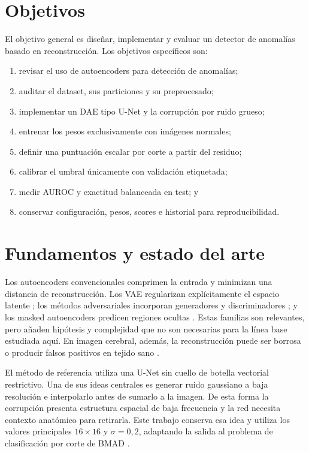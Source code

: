 \documentclass[10pt,a4paper,twocolumn]{article}
\begin{document}
\section{Objetivos}
El objetivo general es diseñar, implementar y evaluar un detector de anomalías
basado en reconstrucción. Los objetivos específicos son:
\begin{enumerate}
  \item revisar el uso de autoencoders para detección de anomalías;
  \item auditar el dataset, sus particiones y su preprocesado;
  \item implementar un DAE tipo U-Net y la corrupción por ruido grueso;
  \item entrenar los pesos exclusivamente con imágenes normales;
  \item definir una puntuación escalar por corte a partir del residuo;
  \item calibrar el umbral únicamente con validación etiquetada;
  \item medir AUROC y exactitud balanceada en test; y
  \item conservar configuración, pesos, scores e historial para reproducibilidad.
\end{enumerate}

\section{Fundamentos y estado del arte}
Los autoencoders convencionales comprimen la entrada y minimizan una distancia
de reconstrucción. Los VAE regularizan explícitamente el espacio latente
\cite{kingma2014vae}; los métodos adversariales incorporan generadores y
discriminadores \cite{goodfellow2014gan}; y los masked autoencoders predicen
regiones ocultas \cite{he2022mae,georgescu2023masked}. Estas familias son
relevantes, pero añaden hipótesis y complejidad que no son necesarias para la
línea base estudiada aquí. En imagen cerebral, además, la reconstrucción puede
ser borrosa o producir falsos positivos en tejido sano
\cite{baur2021autoencoders}.

El método de referencia \cite{kascenas2022denoising} utiliza una U-Net sin
cuello de botella vectorial restrictivo. Una de sus ideas centrales es generar
ruido gaussiano a baja resolución e interpolarlo antes de sumarlo a la imagen.
De esta forma la corrupción presenta estructura espacial de baja frecuencia y
la red necesita contexto anatómico para retirarla. Este trabajo conserva esa
idea y utiliza los valores principales $16\times16$ y $\sigma=0{,}2$, adaptando
la salida al problema de clasificación por corte de BMAD \cite{bao2024bmad}.
\end{document}
